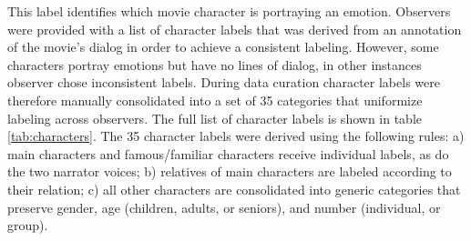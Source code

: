 This label identifies which movie character is portraying an emotion. Observers
were provided with a list of character labels that was derived from an
annotation of the movie's dialog in order to achieve a consistent labeling.
However, some characters portray emotions but have no lines of dialog, in other
instances observer chose inconsistent labels. During data curation character
labels were therefore manually consolidated into a set of 35 categories that
uniformize labeling across observers. The full list of character labels is
shown in table \ref{tab:characters}. The 35 character labels were derived using
the following rules: a) main characters and famous/familiar characters receive
individual labels, as do the two narrator voices; b) relatives of main
characters are labeled according to their relation; c) all other characters are
consolidated into generic categories that preserve gender, age (children,
adults, or seniors), and number (individual, or group).


